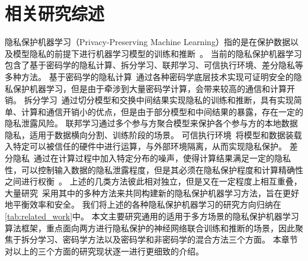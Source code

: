 \chapter{相关研究综述}
隐私保护机器学习（Privacy-Preserving Machine Learning）指的是在保护数据以及模型隐私的前提下进行机器学习模型的训练和推断~\cite{tan_2020_PPML_survey_ch}。
%
当前的隐私保护机器学习包含了基于密码学的隐私计算、拆分学习、联邦学习、可信执行环境、差分隐私等多种方法。
%
基于密码学的隐私计算~\cite{al_2019_ppml}通过各种密码学底层技术实现可证明安全的隐私保护机器学习，但是由于牵涉到大量密码学计算，会带来较高的通信和计算开销。
%
拆分学习~\cite{vepakomma2018split}通过切分模型和交换中间结果实现隐私的训练和推断，具有实现简单、计算和通信开销小的优点，但是由于部分模型和中间结果的暴露，存在一定的隐私泄露风险。
%
联邦学习\cite{yangqiang2019federated,mcmahan_2017_fedavg, zhouchuanxin_2021_fed_survey_ch}通过多个参与方聚合模型来保护各个参与方的本地数据隐私，适用于数据横向分割、训练阶段的场景。
%
可信执行环境~\cite{sabt_2015_tee,2016_intel_sgx}将模型和数据装载入特定可以被信任的硬件中进行运算，与外部环境隔离，从而实现隐私保护。
%
差分隐私~\cite{dwork_2006_differential_privacy,wuruihan_2023_label_dp}通过在计算过程中加入特定分布的噪声，使得计算结果满足一定的隐私性，可以控制输入数据的隐私泄露程度，但是其必须在隐私保护程度和计算精确性之间进行权衡~\cite{abadi_2016_dp_dl}。
%
上述的几类方法彼此相对独立，但是又在一定程度上相互重叠，大量研究~\cite{zhangqiao_2018_gelu_net,bonawitz_2017_secure_agg,thapa_2022_splitfed,zhou_2022_codesign,riazi_2018_chameleon,weikang_2020_fed_dp}采用其中的多种方法来共同构建新的隐私保护机器学习方法，旨在更好地平衡效率和安全。
%
我们将上述的各种隐私保护机器学习的研究方向归纳在\autoref{tab:related_work}中。
%
本文主要研究通用的适用于多方场景的隐私保护机器学习算法框架，重点面向两方进行隐私保护的神经网络联合训练和推断的场景，因此聚焦于拆分学习、密码学方法以及密码学和非密码学的混合方法三个方面。
%
本章节对以上的三个方面的研究现状逐一进行更细致的介绍。

